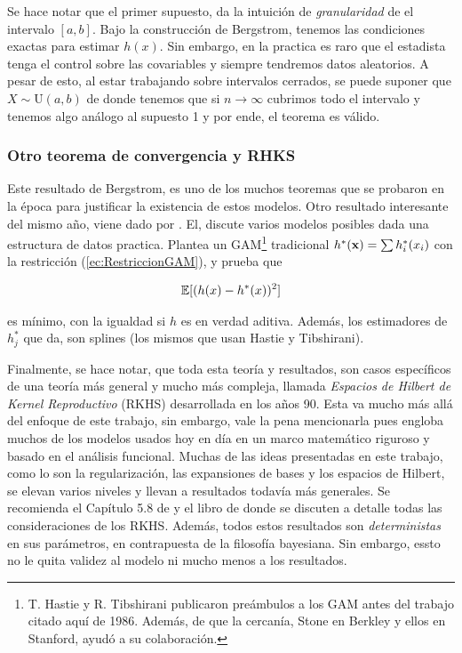 \documentclass[../Main/Main.tex]{subfiles}
\begin{document}
Se hace notar que el primer supuesto, da la intuición de \textit{granularidad} de el intervalo $[a,b]$. Bajo la construcción de Bergstrom, tenemos las condiciones exactas para estimar $h(x)$. Sin embargo, en la practica es raro que el estadista tenga el control sobre las covariables y siempre tendremos datos aleatorios. A pesar de esto, al estar trabajando sobre intervalos cerrados, se puede suponer que $X \sim \text{U}(a,b)$ de donde tenemos que si $n\to\infty$ cubrimos todo el intervalo y tenemos algo análogo al supuesto 1 y por ende, el teorema es válido. 

\subsubsection*{Otro teorema de convergencia y RHKS}

Este resultado de Bergstrom, es uno de los muchos teoremas que se probaron en la época para justificar la existencia de estos modelos. Otro resultado interesante del mismo año, viene dado por \autocite{stone1985additive}. El, discute varios modelos posibles dada una estructura de datos practica. Plantea un GAM\footnote{T. Hastie y R. Tibshirani publicaron preámbulos a los GAM antes del trabajo citado aquí de 1986. Además, de que la cercanía, Stone en Berkley y ellos en Stanford, ayudó a su colaboración.} tradicional $h^*(\mathbf{x}) = \sum h_i^*(x_i)$ con la restricción (\ref{ec:RestriccionGAM}), y prueba que

\begin{align*}
	\mathbb{E}[(h(x) - h^*(x))^2] 
\end{align*}

es mínimo, con la igualdad si $h$ es en verdad aditiva. Además, los estimadores de $h_j^*$ que da, son splines (los mismos que usan Hastie y Tibshirani).

Finalmente, se hace notar, que toda esta teoría y resultados, son casos específicos de una teoría más general y mucho más compleja, llamada \textit{Espacios de Hilbert de Kernel Reproductivo} (RKHS) desarrollada en los años 90. Esta va mucho más allá del enfoque de este trabajo, sin embargo, vale la pena mencionarla pues engloba muchos de los modelos usados hoy en día en un marco matemático riguroso y basado en el análisis funcional. Muchas de las ideas presentadas en este trabajo, como lo son la regularización, las expansiones de bases y los espacios de Hilbert, se elevan varios niveles y llevan a resultados todavía más generales. Se recomienda el Capítulo 5.8 de \autocite{hastie2008elements} y el libro de \autocite{wahba1990splines} donde se discuten a detalle todas las consideraciones de los RKHS. Además, todos estos resultados son \textit{deterministas} en sus parámetros, en contrapuesta de la filosofía bayesiana. Sin embargo, essto no le quita validez al modelo ni mucho menos a los resultados. 

\end{document}
